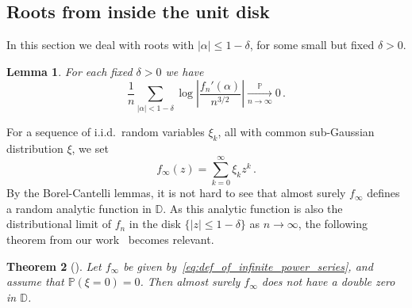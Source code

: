 \documentclass[11pt]{amsart}
\newtheorem{theorem}{Theorem}
\newtheorem{lemma}[theorem]{Lemma}
\theoremstyle{remark}
\theoremstyle{definition}
\newcommand{\bD}{\mathbb D}
\newcommand{\bP}{\mathbb P}
\begin{document}
    \subsection{Roots from inside the unit disk}
     In this section we deal with roots with $|\alpha| \le 1-\delta$, for some small but fixed $\delta>0$.  
       \begin{lemma}\label{lemma:sum-inside-unit-disk}
        For each fixed $\delta > 0 $ we have $$\frac{1}{n} \sum_{|\alpha| < 1- \delta} \log \left| \frac{f_n'(\alpha)}{n^{3/2}}\right| \xrightarrow[n\to\infty]{\bP} 0 \, .$$
    \end{lemma}
    \noindent
    For a sequence of i.i.d.\ random variables $\xi_k$, all with common sub-Gaussian distribution $\xi$, we set
    \begin{equation}
    \label{eq:def_of_infinite_power_series}
	    f_\infty(z) = \sum_{k = 0}^\infty \xi_k z^k\, .
	\end{equation}
    By the Borel-Cantelli lemmas, it is not hard to see that almost surely $f_\infty$ defines a random analytic function in $\bD$. As this analytic function is also the distributional limit of $f_n$ in the disk $\{|z|\le 1-\delta\}$ as $n\to \infty$, the following theorem from our work~\cite{Michelen-Yakir-root-separation} becomes relevant. 
    \begin{theorem}[{\cite[Theorem~1.3]{Michelen-Yakir-root-separation}}]
    \label{thm:almost_sure_no_double_roots_for_random_power_series}
		Let $f_\infty$ be given by~\eqref{eq:def_of_infinite_power_series}, and assume that $\bP(\xi=0) = 0$. Then almost surely $f_\infty$ does not have a double zero in $\bD$. 
	\end{theorem}  
\end{document}
